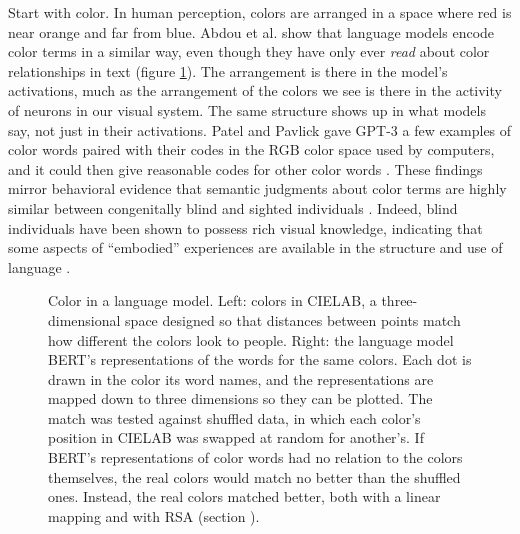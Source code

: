 Start with color. In human perception, colors are arranged in a space where
red is near orange and far from blue. Abdou et al. show that language models
encode color terms in a similar way, even though they have only ever
\emph{read} about color relationships in text \cite{abdou2021can} (figure
\ref{llmColorSpace}). The arrangement is there in the model's activations,
much as the arrangement of the colors we see is there in the activity of
neurons in our visual system. The same structure shows up in
what models say, not just in their activations. Patel and Pavlick gave GPT-3 a
few examples of color words paired with their codes in the RGB color space used
by computers, and it could then give reasonable codes for other color words
\cite{patel2022mapping}. These findings mirror
behavioral evidence that semantic judgments about color terms are highly
similar between congenitally blind and sighted individuals
\cite{marmor1978age, saysani2018colour}. Indeed, blind individuals have been
shown to possess rich visual knowledge, indicating that some aspects of
``embodied'' experiences are available in the structure and use of language
\cite{kim2019knowledge, liu2025learning}.

\begin{figure}[ht]
\centering
{}
\caption[From \cite{abdou2021can}.]{Color in a language model. Left:
colors in CIELAB, a three-dimensional space designed so that distances between
points match how different the colors look to people. Right: the language
model BERT's representations of the words for the same colors. Each dot is
drawn in the color its word names, and the representations are mapped down
to three dimensions so they can be plotted. The match was tested against
shuffled data, in which each color's position in CIELAB was swapped at random
for another's. If BERT's representations of color words had no relation to the
colors themselves, the real colors would match no better than the shuffled
ones. Instead, the real colors matched better, both with a linear mapping and
with RSA (section ).}
\label{llmColorSpace}
\end{figure}

